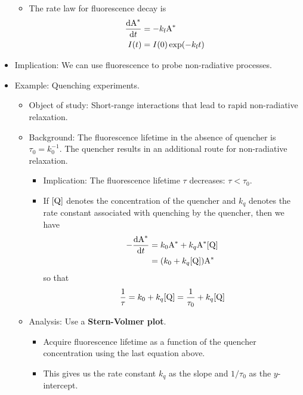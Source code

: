 \documentclass[../notes.tex]{subfiles}
\begin{document}
\begin{itemize}
\begin{itemize}
        \item The rate law for fluorescence decay is
        \begin{align*}
            \dv{\ce{A^*}}{t} &= -k_\text{f}\ce{A^*}\\
            I(t) &= I(0)\exp(-k_\text{f}t)
        \end{align*}
    \end{itemize}
    \item Implication: We can use fluorescence to probe non-radiative processes.
    \item Example: Quenching experiments.
    \begin{itemize}
        \item Object of study: Short-range interactions that lead to rapid non-radiative relaxation.
        \item Background: The fluorescence lifetime in the absence of quencher is $\tau_0=k_0^{-1}$. The quencher results in an additional route for non-radiative relaxation.
        \begin{itemize}
            \item Implication: The fluorescence lifetime $\tau$ decreases: $\tau<\tau_0$.
            \item If $[\ce{Q}]$ denotes the concentration of the quencher and $k_q$ denotes the rate constant associated with quenching by the quencher, then we have
            \begin{align*}
                -\dv{\ce{A^*}}{t} &= k_0\ce{A^*}+k_q\ce{A^*}[\ce{Q}]\\
                &= (k_0+k_q[\ce{Q}])\ce{A^*}
            \end{align*}
            so that
            \begin{equation*}
                \frac{1}{\tau} = k_0+k_q[\ce{Q}]
                = \frac{1}{\tau_0}+k_q[\ce{Q}]
            \end{equation*}
        \end{itemize}
        \item Analysis: Use a \textbf{Stern-Volmer plot}.
        \begin{itemize}
            \item Acquire fluorescence lifetime as a function of the quencher concentration using the last equation above.
            \item This gives us the rate constant $k_q$ as the slope and $1/\tau_0$ as the $y$-intercept.
        \end{itemize}
    \end{itemize}

\end{itemize}
\end{document}
